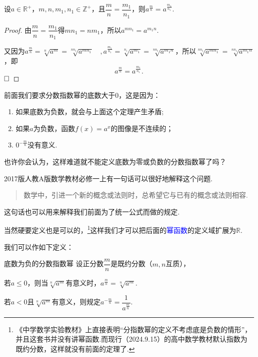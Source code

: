 \documentclass[lang=cn,math=cm,chinesefont=nofont,11pt,scheme=chinese,twocol]{elegantbook}
\begin{document}
\begin{theorem}\label{ExponentTheorem1}
  设$a\in\mathbb{R}^+$，$m,n,m_1,n_1\in\mathbb{Z}^+$，且$\dfrac mn=\dfrac{m_1}{n_1}$，则$a^{\frac mn}=a^\frac{m_1}{n_1}$.
\end{theorem}

\begin{proof}
  由$\dfrac mn=\dfrac{m_1}{n_1}$得$mn_1=nm_1$，所以$a^{mn_1}=a^{m_1n}$.

  又因为$a^{\frac mn}=\sqrt[n]{a^m}=\sqrt[nn_1]{a^{mn_1}}\quad ,a^{\frac{m_1}{n_1}}=\sqrt[n_1]{a^{m_1}}=\sqrt[nn_1]{a^{m_1n}}$，所以$\sqrt[nn_1]{a^{mn_1}}=\sqrt[nn_1]{a^{m_1n}}$，即$$a^{\frac mn}=a^{\frac{m_1}{n_1}}.$$ $\hfill\square$
\end{proof}

前面我们要求分数指数幂的底数大于$0$，这是因为：

\begin{enumerate}
  \item 如果底数为负数，就会与上面这个定理产生矛盾;
  \item 如果$a$为负数，函数$f(x)=a^x$的图像是不连续的；
  \item $0^{-\frac{m}{n}}$没有意义.
\end{enumerate}

也许你会认为，这样难道就不能定义底数为零或负数的分数指数幂了吗？

2017版人教A版数学教材必修一上有一句话可以很好地解释这个问题.

\begin{quotation}
  数学中，引进一个新的概念或法则时，总希望它与已有的概念或法则相容.
\end{quotation}

这句话也可以用来解释我们前面为了统一公式而做的规定.

当然硬要定义也是可以的，\footnote{《中学数学实验教材》上直接表明“分指数幂的定义不考虑底是负数的情形”，并且这套书并没有讲幂函数.而现行（2024.9.15）的高中数学教材默认指数为既约分数，这样就没有前面的定理了.}这样我们才可以把后面的\textcolor{blue}{幂函数}的定义域扩展为$\mathbb{R}$.

我们可以作如下定义：

\begin{definition}{底数为负的分数指数幂}
  设正分数$\dfrac{m}{n}$是既约分数（$m,n$互质），
  
  若$a\leqslant 0$，则当$\sqrt[n]{a^m}$有意义时，$a^{\frac{m}{n}}=\sqrt[n]{a^m}$.

  若$a<0$且$\sqrt[n]{a^m}$有意义，则规定$a^{-\frac{m}{n}}=\dfrac{1}{a^\frac{m}{n}}$.
\end{definition}
\end{document}
